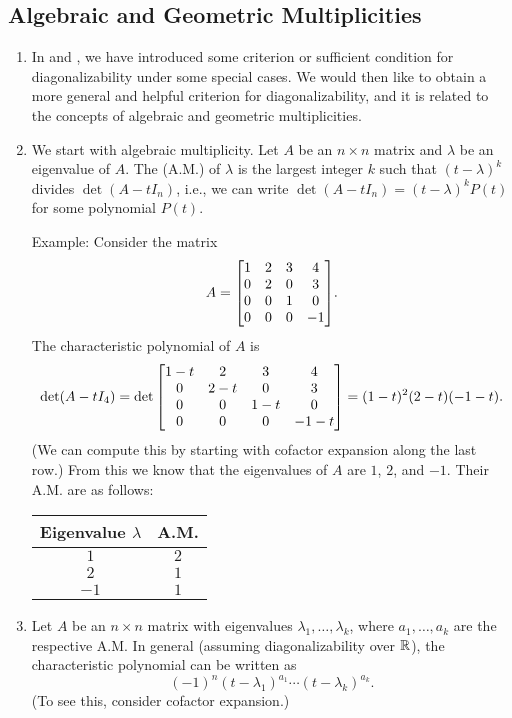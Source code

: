 \subsection{Algebraic and Geometric Multiplicities}
\begin{enumerate}
\item In  and
, we have introduced some criterion or
sufficient condition for diagonalizability under some special cases. We would
then like to obtain a more general and helpful criterion for diagonalizability,
and it is related to the concepts of algebraic and geometric multiplicities.

\item We start with algebraic multiplicity. Let \(A\) be an \(n\times n\)
matrix and \(\lambda\) be an eigenvalue of \(A\). The  (A.M.) of \(\lambda\) is the largest integer \(k\) such that
\((t-\lambda)^{k}\) divides \(\det(A-tI_n)\), i.e., we can write
\(\det(A-tI_n)=(t-\lambda)^{k}P(t)\) for some polynomial \(P(t)\).

Example: Consider the matrix
\[
A=\mqty[1&2&3&4\\ 0&2&0&3\\ 0&0&1&0\\ 0&0&0&-1].
\]
The characteristic polynomial of \(A\) is
\[
\det(A-tI_4)=\det\mqty[1-t&2&3&4\\ 0&2-t&0&3\\ 0&0&1-t&0\\ 0&0&0&-1-t]
=(1-t)^2(2-t)(-1-t).
\]
(We can compute this by starting with cofactor expansion along the last row.)
From this we know that the eigenvalues of \(A\) are \(1\), \(2\), and \(-1\).
Their A.M. are as follows:
\begin{center}
\begin{tabular}{cc}
\toprule
Eigenvalue \(\lambda\)&A.M.\\
\midrule
\(1\)&\(2\)\\
\(2\)&\(1\)\\
\(-1\)&\(1\)\\
\bottomrule
\end{tabular}
\end{center}

\item \label{it:char-poly-am}
Let \(A\) be an \(n\times n\) matrix with eigenvalues
\(\lambda_1,\dotsc,\lambda_k\), where \(a_1,\dotsc,a_k\) are the respective
A.M. In general (assuming diagonalizability over \(\mathbb{R}\)), the characteristic
polynomial can be written as
\[
(-1)^{n}(t-\lambda_1)^{a_1}\dotsb(t-\lambda_k)^{a_k}.
\]
(To see this, consider cofactor expansion.)


\end{enumerate}
